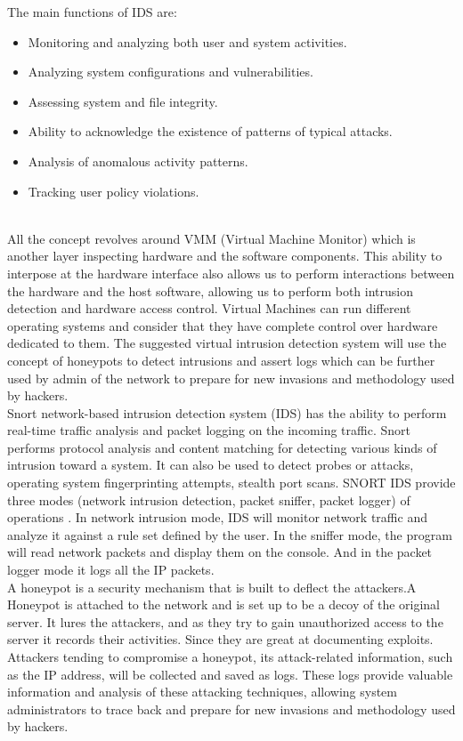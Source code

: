 \documentclass[conference]{IEEEtran}
\begin{document}
The main functions of IDS are: 

\begin{itemize}
\item Monitoring and analyzing both user and system activities.
\item Analyzing system configurations and vulnerabilities. 
\item Assessing system and file integrity. 
\item Ability to acknowledge the existence of patterns of typical attacks.
\item Analysis of anomalous activity patterns.
\item Tracking user policy violations.
\end{itemize}
\\
All the concept revolves around VMM (Virtual Machine Monitor) which is another layer inspecting hardware and the software components. This ability to interpose at the hardware interface also allows us to perform interactions between the hardware and the host software, allowing us to perform both intrusion detection and hardware access control. Virtual Machines can run different operating systems and consider that they have complete control over hardware dedicated to them. The suggested virtual intrusion detection system will use the concept of honeypots to detect intrusions and assert logs which can be further used by admin of the network to prepare for new invasions and methodology used by hackers.\\
Snort network-based intrusion detection system (IDS) has the ability to perform real-time traffic analysis and packet logging on the incoming traffic. Snort performs protocol analysis and content matching \cite{b1} for detecting various kinds of intrusion toward a system. It can also be used to detect probes or attacks, operating system fingerprinting attempts, stealth port scans. SNORT IDS provide three modes (network intrusion detection, packet sniffer, packet logger) of operations \cite{b2}. In network intrusion mode, IDS will monitor network traffic and analyze it against a rule set defined by the user. In the sniffer mode, the program will read network packets and display them on the console. And in the packet logger mode it logs all the IP packets.\\
A honeypot is a security mechanism that is built to deflect the attackers.A Honeypot is attached to the network and is set up to be a decoy of the original server. It lures the attackers, and as they try to gain unauthorized access to the server it records their activities. Since they are great at documenting exploits. Attackers tending to compromise a honeypot, its attack-related information, such as the IP address, will be collected and saved as logs. These logs provide valuable information and analysis of these attacking techniques, allowing system administrators to trace back and prepare for new invasions and methodology used by hackers.\\
\end{document}
